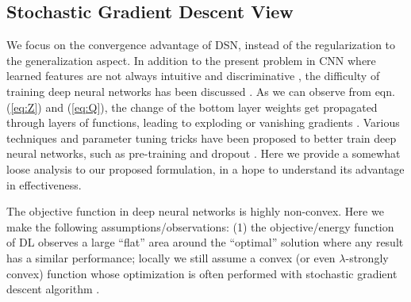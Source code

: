 \documentclass{article} %
\begin{document}

\subsection{Stochastic Gradient Descent View}

We focus on the convergence advantage of DSN, instead of the regularization to the generalization aspect. In addition to the present problem in CNN where learned features are not always intuitive and discriminative \cite{Zeiler13}, the difficulty of training deep neural networks has been discussed \cite{Glorot10,Pascanu14}. As we can observe from eqn. (\ref{eq:Z}) and (\ref{eq:Q}), the change of the bottom layer weights get propagated through layers of functions, leading to exploding or vanishing gradients \cite{Pascanu14}. Various techniques and parameter tuning tricks have been proposed to better train deep neural networks, such as pre-training and dropout \cite{dropout}.
Here we provide a somewhat loose analysis to our proposed formulation, in a hope to understand its advantage in effectiveness. 

The objective function in deep neural networks is highly non-convex.
Here we make the following assumptions/observations: (1) the objective/energy function of DL observes a large ``flat'' area around the ``optimal'' solution where any result has a similar performance; locally we still assume a convex (or even $\lambda$-strongly convex) function whose optimization is often performed with stochastic gradient descent algorithm \cite{Bottou98}.    
\end{document}
